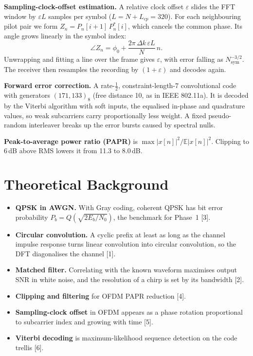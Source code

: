 \documentclass[11pt,a4paper]{report}
\begin{document}
\textbf{Sampling-clock-offset estimation.} A relative clock offset $\varepsilon$
slides the FFT window by $\varepsilon L$ samples per symbol ($L=N+L_{cp}=320$). For
each neighbouring pilot pair we form
$Z_n = P_n[i+1]\,P_n^*[i]$, which cancels the common phase. Its angle grows linearly
in the symbol index:
\begin{equation}
\angle Z_n = \phi_0 + \frac{2\pi\,\Delta k\,\varepsilon L}{N}\,n .
\end{equation}
Unwrapping and fitting a line over the frame gives $\varepsilon$, with error falling
as $N_{\text{sym}}^{-3/2}$. The receiver then resamples the recording by
$(1+\varepsilon)$ and decodes again.

\textbf{Forward error correction.} A rate-$\tfrac12$, constraint-length-7
convolutional code with generators $(171,133)_8$ (free distance 10, as in IEEE
802.11a). It is decoded by the Viterbi algorithm with soft inputs, the equalised
in-phase and quadrature values, so weak subcarriers carry proportionally less weight.
A fixed pseudo-random interleaver breaks up the error bursts caused by spectral nulls.

\textbf{Peak-to-average power ratio (PAPR)} is
$\max|x[n]|^2/\mathbb{E}|x[n]|^2$. Clipping to 6\,dB above RMS lowers it from
11.3 to 8.0\,dB.

\section{Theoretical Background}
\begin{itemize}
    \item \textbf{QPSK in AWGN.} With Gray coding, coherent QPSK has bit error
    probability $P_b = Q\left(\sqrt{2E_b/N_0}\right)$, the benchmark for Phase~1
    [3].
    \item \textbf{Circular convolution.} A cyclic prefix at least as long as the channel
    impulse response turns linear convolution into circular convolution, so the DFT
    diagonalises the channel [1].
    \item \textbf{Matched filter.} Correlating with the known waveform maximises output
    SNR in white noise, and the resolution of a chirp is set by its bandwidth
    [2].
    \item \textbf{Clipping and filtering} for OFDM PAPR reduction [4].
    \item \textbf{Sampling-clock offset} in OFDM appears as a phase rotation
    proportional to subcarrier index and growing with time [5].
    \item \textbf{Viterbi decoding} is maximum-likelihood sequence detection on the
    code trellis [6].
\end{itemize}
\end{document}
